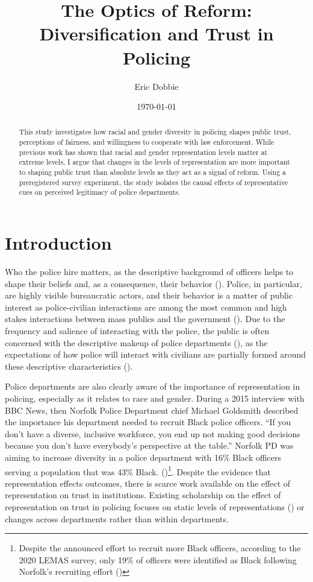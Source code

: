 \documentclass[12pt]{article}
\title{The Optics of Reform: Diversification and Trust in Policing}
\author{Eric Dobbie}
\date{\today}
\begin{document}
\maketitle
\doublespacing

\begin{abstract}
This study investigates how racial and gender diversity in policing shapes public trust, perceptions of fairness, and willingness to cooperate with law enforcement. While previous work has shown that racial and gender representation levels matter at extreme levels, I argue that changes in the levels of representation are more important to shaping public trust than absolute levels as they act as a signal of reform. Using a preregistered survey experiment, the study isolates the causal effects of representative cues on perceived legitimacy of police departments.
\end{abstract}

\newpage
\section{Introduction}

Who the police hire matters, as the descriptive background of officers helps to shape their beliefs and, as a consequence, their behavior (\cite{kennedy2017race, shoub2021female, ba2021role}). Police, in particular, are highly visible bureaucratic actors, and their behavior is a matter of public interest as police-civilian interactions are among the most common and high stakes interactions between mass publics and the government (\cite{lipsky1980street}).  Due to the frequency and salience of interacting with the police, the public is often concerned with the descriptive makeup of police departments (\cite{peyton_beliefs_2022}), as the expectations of how police will interact with civilians are partially formed around these descriptive characteristics (\cite{mansbridge1999should, meier1975representative}).

Police departments are also clearly aware of the importance of representation in policing, especially as it relates to race and gender. During a 2015 interview with BBC News, then Norfolk Police Department chief Michael Goldsmith described the importance his department needed to recruit Black police officers. ``If you don't have a diverse, inclusive workforce, you end up not making good decisions because you don't have everybody's perspective at the table.'' Norfolk PD was aiming to increase diversity in a police department with 16\% Black officers serving a population that was 43\% Black. (\cite{NorfolkPD_BBCRecruitment_2015})\footnote{Despite the announced effort to recruit more Black officers, according to the 2020 LEMAS survey, only 19\% of officers were identified as Black following Norfolk's recruiting effort  (\cite{LEMAS2020})}. Despite the evidence that representation effects outcomes, there is scarce work available on the effect of representation on trust in institutions. Existing scholarship on the effect of representation on trust in policing focuses on static levels of representations (\cite{stauffer2023police, riccucci2014representative}) or changes across departments rather than within departments.
\end{document}
